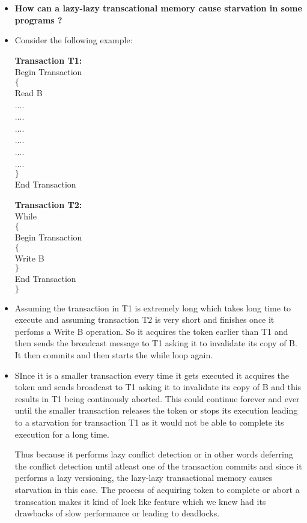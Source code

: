 \documentclass[11pt]{article}
\begin{document}
\begin{itemize}
	\item[] \textbf{How can a lazy-lazy transcational memory cause starvation in some programs ?}
	
	\item[] Consider the following example:
	
	\textbf{Transaction T1:}\\
	Begin Transaction\\
	$\{$\\
	Read B \\
	....\\
	....\\
	....\\
	....\\
	....\\
	....\\
	$\}$\\
	End Transaction
	
	\textbf{Transaction T2:}\\
	While\\
	$\{$\\
	Begin Transaction\\
	$\{$\\
	Write B\\
	$\}$\\
	End Transaction\\
	$\}$\\
	
	\item[] Assuming the transaction in T1 is extremely long which takes long time to execute and assuming transaction  T2 is very short and finishes once it perfoms a Write B operation. So it acquires the token earlier than T1 and then sends the broadcast message to T1 asking it to invalidate its copy of B. It then commits and then starts the while loop again. 
	
	\item[] SInce it is a smaller transaction every time it gets executed it acquires the token and sends broadcast to T1 asking it to invalidate its copy of B and this results in T1 being continously aborted. This could continue forever and ever until the smaller transaction releases the token or stops its execution leading to a starvation for transaction T1  as it would not be able to complete its execution for a long time.
	
	
	Thus because it performs lazy conflict detection or in other words deferring the conflict detection until atleast one of the transaction commits and since it performs a lazy versioning, the lazy-lazy transactional memory causes starvation in this case. The process of acquiring token to complete or abort a transcation makes it kind of lock like feature which we knew had its drawbacks of slow performance or leading to deadlocks.
	

\end{itemize}
\end{document}
